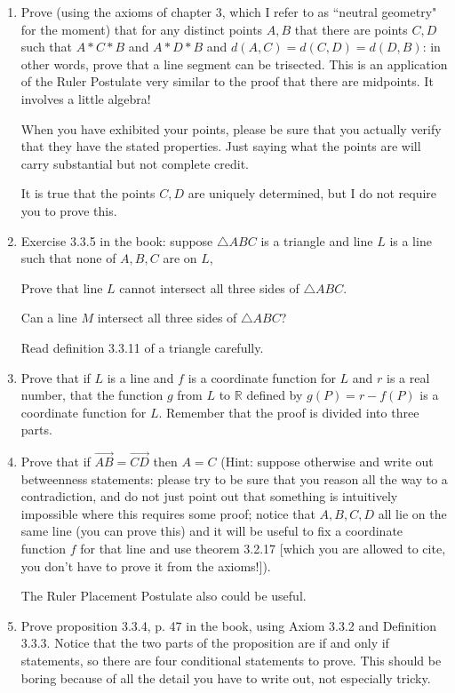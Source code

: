 \documentclass[12pt]{article}
\begin{document}
\begin{enumerate}
\newpage

\item  Prove (using the axioms of chapter 3, which I refer to as ``neutral geometry" for the moment) that for any distinct points $A,B$ that there are
points $C,D$ such that $A*C*B$ and $A*D*B$ and $d(A,C) = d(C,D) = d(D,B)$:  in other words, prove that a line segment can be trisected.  This is an application
of the Ruler Postulate very similar to the proof that there are midpoints.  It involves a little algebra!

When you have exhibited your points, please be sure that you actually verify that they have the stated properties.  Just saying what the points are will carry substantial but not complete credit.

It is true that the points $C,D$ are uniquely determined, but I do not require you to prove this.

\newpage

\item  Exercise 3.3.5 in the book:  suppose $\triangle ABC$ is a triangle and line $L$ is a line such that none of $A,B,C$ are on $L$,

Prove that line $L$ cannot intersect all three sides of $\triangle ABC$.

Can a line $M$ intersect all three sides of  $\triangle ABC$?

Read definition 3.3.11 of a triangle carefully.

\newpage

\item  Prove that if $L$ is a line and $f$ is a coordinate function for $L$ and $r$ is a real number, that the function $g$ from
$L$ to $\mathbb R$ defined by $g(P) = r-f(P)$ is a coordinate function for $L$.  Remember that the proof is divided into three parts.

\newpage


\item Prove that if $\overrightarrow{AB} = \overrightarrow{CD}$ then $A=C$ (Hint:  suppose otherwise and write out betweenness statements:  please try to be sure that you reason all the way to a contradiction, and do not just point out that something is intuitively impossible where this requires some proof;  notice that
$A,B,C,D$ all lie on the same line (you can prove this) and it will be useful to fix a coordinate function $f$ for that line and use theorem 3.2.17 [which you are allowed to cite, you don't have to prove it from the axioms!]).

The Ruler Placement Postulate also could be useful.

\newpage

\item Prove  proposition 3.3.4, p. 47 in the book,  using Axiom 3.3.2 and Definition 3.3.3.  Notice that the two parts of the proposition are if and only if statements, so there are four conditional statements to prove.  This should be boring because of all the detail you have to write out, not especially tricky.

\newpage

\end{enumerate}
\end{document}
